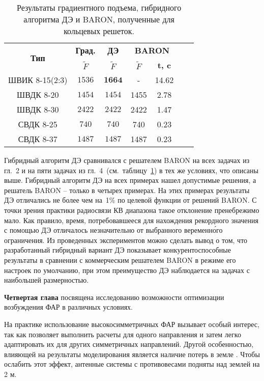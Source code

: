 \begin{table}[!h]

\centering
\caption{ Результаты градиентного подъема, гибридного алгоритма ДЭ и BARON, полученные для кольцевых решеток.}
\begin{tabular}{|c|c|c|cc|c c|}
    \hline
    \multirow{2}{*}{\textbf{Тип}} & \textbf{Град.} & \textbf{ДЭ} & \multicolumn{2}{|c|}{\textbf{BARON}} \\
    & \textbf{$\tilde{F}$} & \textbf{$\tilde{F}$} & \textbf{$\tilde{F}$} & \textbf{t, c}  \\
    \hline
    ШВИК 8-15(2:3) & ${1536}$  & $\mathbf{1664}$     & -   & 14.62     \\
    ШВДК 8-20      & ${1454}$  & ${1454}$  & 1455   & 2.78       \\
    ШВДК 8-30      & ${2422}$  & ${2422}$  & 2422   & 1.47     \\
    СВДК 8-25      & ${740}$  & ${740}$   & 740    & 0.23        \\
    СВДК 8-37      & ${1487}$  & ${1487}$  & 1487   & 0.23      \\
    \hline
\end{tabular}
\label{tab:results_de_2}
\end{table}

Гибридный алгоритм ДЭ сравнивался с решателем BARON на всех задачах из гл.~2 и на пяти задачах из гл.~4~(см.~таблицу~\ref{tab:results_de_2}) в тех же условиях, что описаны выше. Гибридный алгоритм ДЭ на всех примерах нашел допустимые решения, а решатель BARON -- только в четырех примерах. На этих примерах результаты ДЭ отличались не более чем на~1\% по целевой функции от решений BARON. С точки зрения практики радиосвязи КВ диапазона такое отклонение пренебрежимо мало. Как правило, время, потребовавшееся для нахождения рекордного значения с помощью ДЭ отличалось незначительно от выбранного веременн\'{о}го ограничения. Из проведенных экспериментов можно сделать вывод о том, что разработанный гибридный вариант ДЭ показывает конкурентоспособные результаты в сравнении с коммерческим решателем BARON в режиме его настроек по умолчанию, при этом преимущество ДЭ наблюдается на задачах с наибольшей размерностью.

{\textbf{Четвертая глава}} посвящена исследованию возможности оптимизации возбуждения ФАР в различных условиях.

На практике использование высокосимметричных ФАР вызывает особый интерес, так как позволяет выполнить расчеты для одного направления и затем легко адаптировать их для других симметричных направлений. Другой особенностью, влияющей на результаты моделирования является наличие потерь в земле . Чтобы ослабить этот эффект, антенные системы с противовесами подняты над землей на 2 м.

